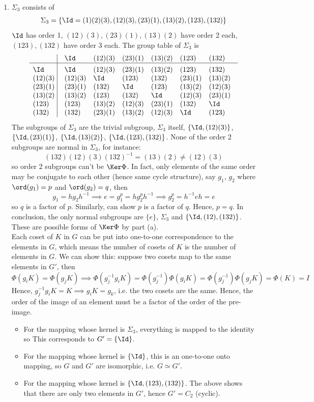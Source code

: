 \documentclass[a4paper]{article}
\begin{document}
\begin{ans}
\begin{enumerate}[label=(\alph*)]
\item $\Sigma_3$ consists of
$$\Sigma_3=\{\Id=(1)(2)(3),(12)(3),(23)(1),(13)(2),(123),(132)\}$$
$\Id$ has order 1, $(12)(3),(23)(1),(13)(2)$ have order 2 each, $(123),(132)$ have order 3 each. The group table of $\Sigma_3$ is
$$\vbox{\tabskip0.5em\offinterlineskip
    \halign{\strut$#$\hfil\ \tabskip1em\vrule&&$#$\hfil\cr
    & \Id & (12)(3) & (23)(1) & (13)(2) & (123) & (132)     \cr
    \noalign{\hrule}\vrule height 12pt width 0pt
    \Id  & \Id & (12)(3)   & (23)(1)   & (13)(2) & (123) & (132)     \cr
     (12)(3) & (12)(3) & \Id & (123)   & (132)   & (23)(1) & (13)(2)     \cr
    (23)(1) & (23)(1)   & (132)   & \Id  & (123) & (13)(2) & (12)(3)      \cr
    (13)(2) & (13)(2)  & (123)   & (132) & \Id   & (12)(3) & (23)(1)      \cr
    (123) & (123) & (13)(2) & (12)(3) & (23)(1) & (132) & \Id \cr
    (132) & (132)  & (23)(1)   & (13)(2)   & (12)(3)   & \Id & (123)     \cr
}}$$
The subgroups of $\Sigma_3$ are the trivial subgroup, $\Sigma_3$ itself, $\{\Id,(12)(3)\}$, $\{\Id,(23)(1)\}$, $\{\Id,(13)(2)\}$, $\{\Id,(123),(132)\}$. None of the order 2 subgroups are normal in $\Sigma_3$, for instance: $$(132)(12)(3)(132)^{-1}=(13)(2)\neq(12)(3)$$
so order 2 subgroups can't be $\Ker\Phi$. In fact, only elements of the same order may be conjugate to each other (hence same cycle structure), say $g_1$, $g_2$ where $\ord(g_1)=p$ and $\ord(g_2)=q$, then
$$g_1=hg_2h^{-1}\implies e=g_1^p=hg_2^ph^{-1}\implies g_2^p=h^{-1}eh=e$$
so $q$ is a factor of $p$. Similarly, can show $p$ is a factor of $q$. Hence, $p=q$. In conclusion, the only normal subgroups are $\{e\}$, $\Sigma_3$ and $\{\Id,(12),(132)\}$. These are possible forms of $\Ker\Phi$ by part (a).\\[5pt]
Each coset of $K$ in $G$ can be put into one-to-one correspondence to the elements in $G$, which means the number of cosets of $K$ is the number of elements in $G$. We can show this: suppose two cosets map to the same elements in $G'$, then
$$\Phi(g_iK)=\Phi(g_jK)\implies \Phi(g_j^{-1}g_iK)=\Phi(g_j^{-1})\Phi(g_iK)=\Phi(g_j^{-1})\Phi(g_jK)=\Phi(K)=I$$
Hence, $g_j^{-1}g_iK=K\implies g_iK=g_k$, i.e. the two cosets are the same. Hence, the order of the image of an element must be a factor of the order of the pre-image.
\begin{itemize}
\item For the mapping whose kernel is $\Sigma_3$, everything is mapped to the identity so This corresponds to $G'=\{\Id\}$.
\item For the mapping whose kernel is $\{\Id\}$, this is an one-to-one onto mapping, so $G$ and $G'$ are isomorphic, i.e. $G\simeq G'$.
\item For the mapping whose kernel is $\{\Id,(123),(132)\}$. The above shows that there are only two elements in $G'$, hence $G'=C_2$ (cyclic).
\end{itemize}
\end{enumerate}
\end{ans}
\end{document}
